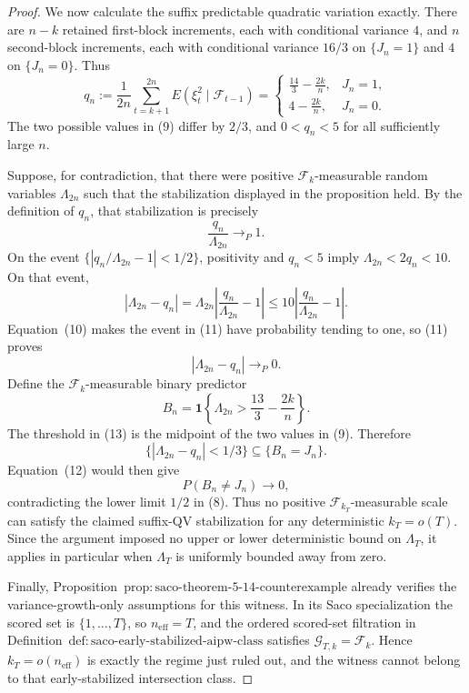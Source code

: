 \documentclass{article}
\begin{document}
\begin{proof}
We now calculate the suffix predictable quadratic variation exactly.  There are \(n-k\) retained first-block increments, each with conditional variance \(4\), and \(n\) second-block increments, each with conditional variance \(16/3\) on \(\{J_n=1\}\) and \(4\) on \(\{J_n=0\}\).  Thus
\[
 q_n:=\frac1{2n}\sum_{t=k+1}^{2n}
 E(\xi_t^2\mid\mathcal F_{t-1})
 =
 \begin{cases}
 \displaystyle\frac{14}{3}-\frac{2k}{n},&J_n=1,\\[5pt]
 \displaystyle4-\frac{2k}{n},&J_n=0.
 \end{cases}
\tag{9}
\]
The two possible values in (9) differ by \(2/3\), and \(0<q_n<5\) for all sufficiently large \(n\).

Suppose, for contradiction, that there were positive \(\mathcal F_k\)-measurable random variables \(\Lambda_{2n}\) such that the stabilization displayed in the proposition held.  By the definition of \(q_n\), that stabilization is precisely
\[
 \frac{q_n}{\Lambda_{2n}}\longrightarrow_P1.
\tag{10}
\]
On the event \(\{|q_n/\Lambda_{2n}-1|<1/2\}\), positivity and \(q_n<5\) imply \(\Lambda_{2n}<2q_n<10\).  On that event,
\[
 |\Lambda_{2n}-q_n|
 =\Lambda_{2n}\left|\frac{q_n}{\Lambda_{2n}}-1\right|
 \le10\left|\frac{q_n}{\Lambda_{2n}}-1\right|.
\tag{11}
\]
Equation~(10) makes the event in (11) have probability tending to one, so (11) proves
\[
 |\Lambda_{2n}-q_n|\longrightarrow_P0.
\tag{12}
\]
Define the \(\mathcal F_k\)-measurable binary predictor
\[
 B_n=\mathbf1\left\{\Lambda_{2n}>
 \frac{13}{3}-\frac{2k}{n}\right\}.
\tag{13}
\]
The threshold in (13) is the midpoint of the two values in (9).  Therefore
\[
 \{|\Lambda_{2n}-q_n|<1/3\}\subseteq\{B_n=J_n\}.
\]
Equation~(12) would then give
\[
 P(B_n\ne J_n)\longrightarrow0,
\tag{14}
\]
contradicting the lower limit \(1/2\) in (8).  Thus no positive \(\mathcal F_{k_T}\)-measurable scale can satisfy the claimed suffix-QV stabilization for any deterministic \(k_T=o(T)\).  Since the argument imposed no upper or lower deterministic bound on \(\Lambda_T\), it applies in particular when \(\Lambda_T\) is uniformly bounded away from zero.

Finally, Proposition~\(\mathrm{prop:saco\text{-}theorem\text{-}5\text{-}14\text{-}counterexample}\) already verifies the variance-growth-only assumptions for this witness.  In its Saco specialization the scored set is \(\{1,\ldots,T\}\), so \(n_{\mathrm{eff}}=T\), and the ordered scored-set filtration in Definition~\(\mathrm{def:saco\text{-}early\text{-}stabilized\text{-}aipw\text{-}class}\) satisfies \(\mathcal G_{T,k}=\mathcal F_k\).  Hence \(k_T=o(n_{\mathrm{eff}})\) is exactly the regime just ruled out, and the witness cannot belong to that early-stabilized intersection class.
\end{proof}
\end{document}
